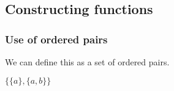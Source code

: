 
\subsection{Constructing functions}

\subsubsection{Use of ordered pairs}

We can define this as a set of ordered pairs.

$\{\{a\},\{a,b\}\}$

